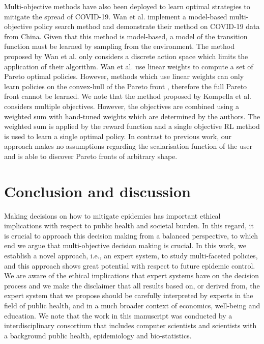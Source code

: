 \documentclass{article}
\renewcommand{\cite}[1]{\citep{#1}}
\begin{document}
Multi-objective methods have also been deployed to learn optimal strategies to mitigate the spread of COVID-19. Wan et al. \cite{wan2021multi} implement a model-based multi-objective policy search method and demonstrate their method on COVID-19 data from China. Given that this method is model-based, a model of the transition function must be learned by sampling from the environment. The method proposed by Wan et al. \cite{wan2021multi} only considers a discrete action space which limits the application of their algorithm. Wan et al. \cite{wan2021multi} use linear weights to compute a set of Pareto optimal policies. However, methods which use linear weights can only learn policies on the convex-hull of the Pareto front \cite{vamplew2008limitations}, therefore the full Pareto front cannot be learned. We note that the method proposed by Kompella et al. \cite{kompella2020reinforcement} considers multiple objectives. However, the objectives are combined using a weighted sum with hand-tuned weights which are determined by the authors. The weighted sum is applied by the reward function and a single objective RL method is used to learn a single optimal policy.
In contrast to previous work, our approach makes no assumptions regarding the scalarisation function of the user and is able to discover Pareto fronts of arbitrary shape.

\section{Conclusion and discussion}
Making decisions on how to mitigate epidemics has important ethical implications with respect to public health and societal burden. In this regard, it is crucial to approach this decision making from a balanced perspective, to which end we argue that multi-objective decision making is crucial. In this work, we establish a novel approach, i.e., an expert system, to study multi-faceted policies, and this approach shows great potential with respect to future epidemic control. We are aware of the ethical implications that expert systems have on the decision process and we make the disclaimer that all results based on, or derived from, the expert system that we propose should be carefully interpreted by experts in the field of public health, and in a much broader context of economics, well-being and education. We note that the work in this manuscript was conducted by a interdisciplinary consortium that includes computer scientists and scientists with a background public health, epidemiology and bio-statistics.
\end{document}

